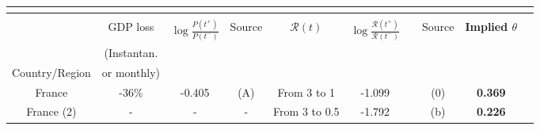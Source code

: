 \documentclass{amsart}
\begin{document}
\begin{table}[htbp]
%
\begin{tabular}{cccccccccc}
\toprule 
\multicolumn{4}{c}{} &  &  &  &  &  & \tabularnewline
\midrule

\midrule 
\hline\hline
\multicolumn{4}{c}{} &  &  &  & \tabularnewline
 & {\footnotesize{}GDP loss} & {\footnotesize{}$\log\frac{P(t^{+})}{P(t^{-})}$} & {\footnotesize{}Source} & {\footnotesize{}$\mathcal{R}(t)$} & {\footnotesize{}$\log\frac{\mathcal{R}(t^{+})}{\mathcal{R}(t^{-})}$} &  & {\footnotesize{}Source} & \textbf{{\footnotesize{}Implied $\theta$}} & \tabularnewline
 & {\footnotesize{}(Instantan. } &  &  &  &  &  &  &  & \tabularnewline
{\footnotesize{}Country/Region} & {\footnotesize{}or monthly) } &  &  &  &  &  &  &  & \tabularnewline
\hline
\midrule 
{\footnotesize{}France} & {\footnotesize{}-36\%} & {\footnotesize{}-0.405} & {\footnotesize{}(A)} & {\footnotesize{}From 3 to 1} & {\footnotesize{}-1.099} &  & {\footnotesize{}(0)} & \textbf{{\footnotesize{}0.369}} & \tabularnewline
{\footnotesize{}France (2)} & {\footnotesize{}-} & {\footnotesize{}-} & {\footnotesize{}-} & {\footnotesize{}From 3 to 0.5} & {\footnotesize{}-1.792} &  & {\footnotesize{}(b)} & \textbf{{\footnotesize{}0.226}} & \tabularnewline


\end{tabular}
\end{table}
\end{document}
